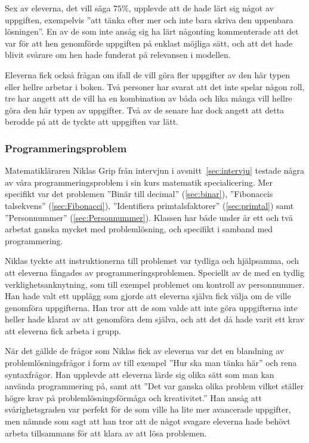         \textcolor{lila}{Sex av eleverna, det vill säga $75\%$, upplevde att de hade lärt sig något av uppgiften, exempelvis ''att tänka efter mer och inte bara skriva den uppenbara lösningen''. En av de som inte ansåg sig ha lärt någonting kommenterade att det var för att hen genomförde uppgiften på enklast möjliga sätt, och att det hade blivit svårare om hen hade funderat på relevansen i modellen.}
    
        \textcolor{lila}{Eleverna fick också frågan om ifall de vill göra fler uppgifter av den här typen eller hellre arbetar i boken. Två personer har svarat att det inte spelar någon roll, tre har angett att de vill ha en kombination av båda och lika många vill hellre göra den här typen av uppgifter. Två av de senare har dock angett att detta berodde på att de tyckte att uppgiften var lätt.}
        
    \subsubsection{Programmeringsproblem}
        \label{resultat:Programmering}
        
        \textcolor{lila}{Matematikläraren Niklas Grip från intervjun i avsnitt~\ref{sec:intervju} testade några av våra programmeringsproblem i sin kurs matematik specialicering. Mer specifikt var det problemen ''Binär till decimal'' (\ref{sec:binar}), ''Fibonaccis talsekvens'' (\ref{sec:Fibonacci}), ''Identifiera primtalsfaktorer'' (\ref{sec:primtal}) samt ''Personnummer'' (\ref{sec:Personnummer}). Klassen har både under år ett och två arbetat ganska mycket med problemlösning, och specifikt i samband med programmering.}
        
        \textcolor{lila}{Niklas tyckte att instruktionerna till problemet var tydliga och hjälpsamma, och att eleverna fångades av programmeringsproblemen. Speciellt av de med en tydlig verklighetsanknytning, som till exempel problemet om kontroll av personnummer. Han hade valt ett upplägg som gjorde att eleverna själva fick välja om de ville genomföra uppgifterna. Han tror att de som valde att inte göra uppgifterna inte heller hade klarat av att genomföra dem själva, och att det då hade varit ett krav att eleverna fick arbeta i grupp.}
        
        \textcolor{lila}{När det gällde de frågor som Niklas fick av eleverna var det en blandning av problemlösningsfrågor i form av till exempel ''Hur ska man tänka här'' och rena syntaxfrågor. Han upplevde att eleverna lärde sig olika sätt som man kan använda programmering på, samt att ''Det var ganska olika problem vilket ställer högre krav på problemlösningsförmåga och kreativitet.'' Han ansåg att svårighetsgraden var perfekt för de som ville ha lite mer avancerade uppgifter, men nämnde som sagt att han tror att de något svagare eleverna hade behövt arbeta tillsammans för att klara av att lösa problemen.}
        
